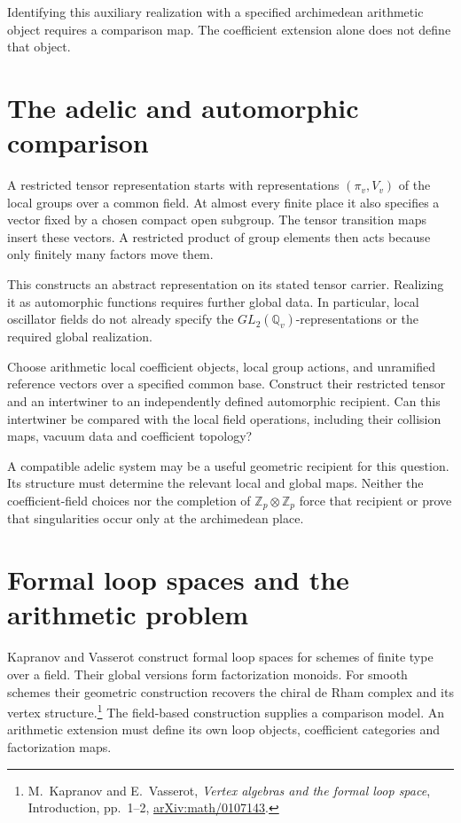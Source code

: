 Identifying this auxiliary realization with a specified
archimedean arithmetic object requires a comparison map.
The coefficient extension alone does not define that object.

\section{The adelic and automorphic comparison}
\label{v4-arith:dk:true-hidden-structure}

A restricted tensor representation starts with representations
\((\pi_v,V_v)\) of the local groups over a common field.
At almost every finite place it also specifies a vector fixed
by a chosen compact open subgroup. The tensor transition maps
insert these vectors. A restricted product of group elements
then acts because only finitely many factors move them.

This constructs an abstract representation on its stated tensor
carrier. Realizing it as automorphic functions requires further
global data. In particular, local oscillator fields do not
already specify the \(GL_2(\mathbb Q_v)\)-representations or
the required global realization.

\begin{question}\label{v4-arith:thm:adelic-automorphic-placement}
Choose arithmetic local coefficient objects, local group actions,
and unramified reference vectors over a specified common base.
Construct their restricted tensor and an intertwiner to an
independently defined automorphic recipient.
Can this intertwiner be compared with the local field operations,
including their collision maps, vacuum data and coefficient topology?
\end{question}

\begin{remark}
A compatible adelic system may be a useful geometric recipient
for this question. Its structure must determine the relevant
local and global maps. Neither the coefficient-field choices
nor the completion of \(\mathbb Z_p\otimes\mathbb Z_p\)
force that recipient or prove that singularities occur only
at the archimedean place.
\end{remark}

\section{Formal loop spaces and the arithmetic problem}
\label{v4-arith:dk:kapranov-built}

\begin{remark}
Kapranov and Vasserot construct formal loop spaces for schemes
of finite type over a field. Their global versions form
factorization monoids. For smooth schemes their geometric
construction recovers the chiral de Rham complex and its
vertex structure.\footnote{M.~Kapranov and E.~Vasserot,
\emph{Vertex algebras and the formal loop space},
Introduction, pp.~1--2,
\href{https://arxiv.org/abs/math/0107143}{arXiv:math/0107143}.}
The field-based construction supplies a comparison model.
An arithmetic extension must define its own loop objects,
coefficient categories and factorization maps.
\end{remark}

